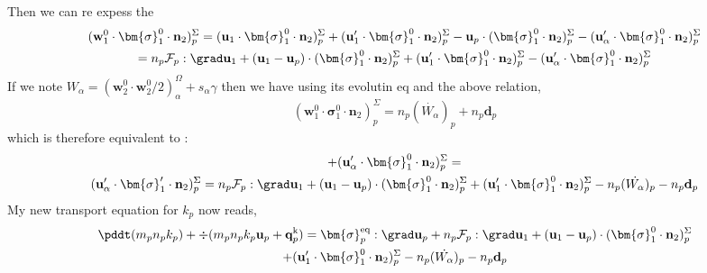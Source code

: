 Then we can re expess the 
\begin{multline*}
    (\textbf{w}_1^0 \cdot \bm{\sigma}_1^0 \cdot  \textbf{n}_2)^\Sigma_p
    = 
    (\textbf{u}_1 \cdot \bm{\sigma}_1^0 \cdot  \textbf{n}_2)^\Sigma_p
    + (\textbf{u}_1' \cdot \bm{\sigma}_1^0 \cdot  \textbf{n}_2)^\Sigma_p
    - \textbf{u}_p \cdot (\bm{\sigma}_1^0 \cdot  \textbf{n}_2)^\Sigma_p
    - (\textbf{u}_\alpha' \cdot \bm{\sigma}_1^0 \cdot  \textbf{n}_2)^\Sigma_p\\
    =   
    n_p \mathcal{F}_p : \grad \textbf{u}_1
    + (\textbf{u}_1 - \textbf{u}_p) \cdot (\bm{\sigma}_1^0 \cdot  \textbf{n}_2)^\Sigma_p
    + (\textbf{u}_1' \cdot \bm{\sigma}_1^0 \cdot  \textbf{n}_2)^\Sigma_p
    - (\textbf{u}_\alpha' \cdot \bm{\sigma}_1^0 \cdot  \textbf{n}_2)^\Sigma_p\\
\end{multline*}
If we note $W_\alpha = (\textbf{w}_2^0\cdot \textbf{w}_2^0/2)^\Omega_\alpha+ s_\alpha\gamma$ then we have using its evolutin eq and the above relation,
\begin{equation}
    (\textbf{w}_1^0 \cdot \bm{\sigma}_1^0 \cdot  \textbf{n}_2)^\Sigma_p
    = 
    n_p (\dot{ W_\alpha})_p
    + n_p \textbf{d}_p
\end{equation}
which is therefore equivalent to : 
\begin{multline*}
    + (\textbf{u}_\alpha' \cdot \bm{\sigma}_1^0 \cdot  \textbf{n}_2)^\Sigma_p
    =\\
     (\textbf{u}_\alpha' \cdot \bm{\sigma}_1' \cdot  \textbf{n}_2)^\Sigma_p
    =
    n_p \mathcal{F}_p : \grad \textbf{u}_1
    + (\textbf{u}_1 - \textbf{u}_p) \cdot (\bm{\sigma}_1^0 \cdot  \textbf{n}_2)^\Sigma_p
    + (\textbf{u}_1' \cdot \bm{\sigma}_1^0 \cdot  \textbf{n}_2)^\Sigma_p
    - n_p (\dot{ W_\alpha})_p
    - n_p \textbf{d}_p
\end{multline*}
My new transport equation for $k_p$ now reads, 
\begin{multline*}
    \pddt(m_p n_pk_p)
    + \div(m_pn_p k_p \textbf{u}_p 
    + \textbf{q}_p^\text{k})
    = 
     \bm{\sigma}_p^\text{eq}  :\grad \textbf{u}_p
     + 
     n_p \mathcal{F}_p : \grad \textbf{u}_1
     + (\textbf{u}_1 - \textbf{u}_p) \cdot (\bm{\sigma}_1^0 \cdot  \textbf{n}_2)^\Sigma_p\\
     + (\textbf{u}_1' \cdot \bm{\sigma}_1^0 \cdot  \textbf{n}_2)^\Sigma_p
     - n_p (\dot{ W_\alpha})_p
     - n_p \textbf{d}_p
    \\
\end{multline*}

